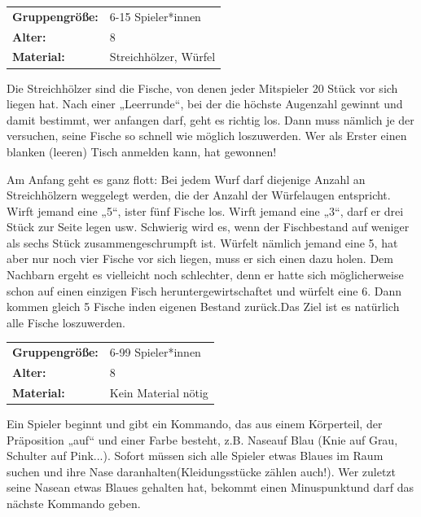 \newpage
\begin{table}[H]
\begin{tabular}{>{\bfseries}lp{8cm}}
   Gruppengröße:   & 6-15 Spieler*innen\\
    Alter: & 8 \\
    Material: & Streichhölzer, Würfel \\
\end{tabular}
\end{table} 
Die Streichhölzer sind die Fische, von denen jeder Mitspieler 20 Stück vor sich liegen hat. Nach einer „Leerrunde“, bei der die höchste Augenzahl gewinnt und damit bestimmt, wer anfangen darf, geht es richtig los. Dann muss nämlich je der versuchen, seine Fische so schnell wie möglich loszuwerden. Wer als Erster einen blanken (leeren) Tisch anmelden kann, hat gewonnen!

Am Anfang geht es ganz flott: Bei jedem Wurf darf diejenige Anzahl an Streichhölzern weggelegt werden, die der Anzahl der Würfelaugen entspricht. Wirft jemand eine „5“, ister fünf Fische los. Wirft jemand eine „3“, darf er drei Stück zur Seite legen usw. Schwierig wird es, wenn der Fischbestand auf weniger als sechs Stück zusammengeschrumpft ist. Würfelt nämlich jemand eine 5, hat aber nur noch vier Fische vor sich liegen, muss er sich einen dazu holen. Dem Nachbarn ergeht es vielleicht noch schlechter, denn er hatte sich möglicherweise schon auf einen einzigen Fisch heruntergewirtschaftet und würfelt eine 6. Dann kommen gleich 5 Fische inden eigenen Bestand zurück.Das Ziel ist es natürlich alle Fische loszuwerden. \\



\begin{table}[H]
\begin{tabular}{>{\bfseries}lp{8cm}}
  Gruppengröße:   & 6-99 Spieler*innen\\
    Alter: & 8 \\
    Material: & Kein Material nötig \\ 
\end{tabular}
\end{table} 
Ein Spieler beginnt und gibt ein Kommando, das aus einem Körperteil, der Präposition „auf“ und einer Farbe besteht, z.B. Naseauf Blau (Knie auf Grau, Schulter auf Pink...). Sofort müssen sich alle Spieler etwas Blaues im Raum suchen und ihre Nase daranhalten(Kleidungsstücke zählen auch!). Wer zuletzt seine  Nasean etwas Blaues gehalten hat, bekommt einen Minuspunktund darf das  nächste Kommando geben. \\




